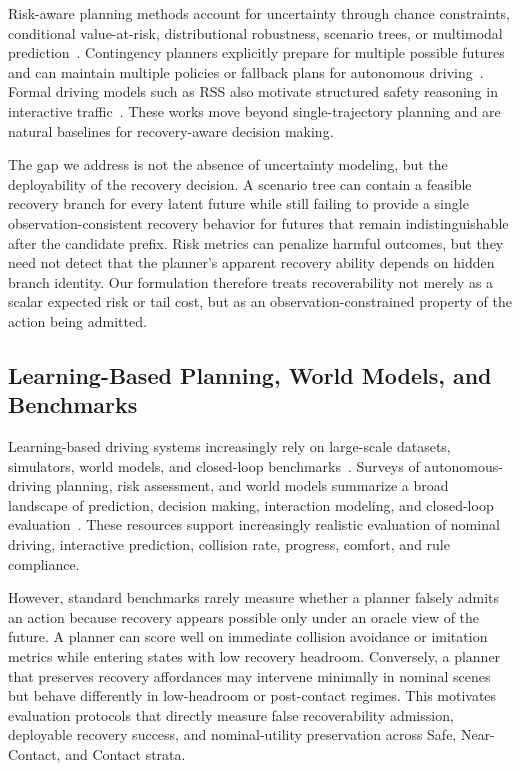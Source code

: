 \documentclass[conference]{IEEEtran}
\begin{document}
Risk-aware planning methods account for uncertainty through chance constraints, conditional value-at-risk, distributional robustness, scenario trees, or multimodal prediction~\cite{uryasev2000conditional,hakobyan2021wasserstein,safaoui2024distributionally,batkovic2020robust,nair2024predictive}.  Contingency planners explicitly prepare for multiple possible futures and can maintain multiple policies or fallback plans for autonomous driving~\cite{li2023marc,mustafa2024racp}.  Formal driving models such as RSS also motivate structured safety reasoning in interactive traffic~\cite{shalev2017formal}.  These works move beyond single-trajectory planning and are natural baselines for recovery-aware decision making.

The gap we address is not the absence of uncertainty modeling, but the deployability of the recovery decision.  A scenario tree can contain a feasible recovery branch for every latent future while still failing to provide a single observation-consistent recovery behavior for futures that remain indistinguishable after the candidate prefix.  Risk metrics can penalize harmful outcomes, but they need not detect that the planner's apparent recovery ability depends on hidden branch identity.  Our formulation therefore treats recoverability not merely as a scalar expected risk or tail cost, but as an observation-constrained property of the action being admitted.

\subsection{Learning-Based Planning, World Models, and Benchmarks}

Learning-based driving systems increasingly rely on large-scale datasets, simulators, world models, and closed-loop benchmarks~\cite{dosovitskiy2017carla,caesar2021nuplan,li2022metadrive,ettinger2021large,wilson2023argoverse,zhan2019interaction,althoff2017commonroad,krajewski2018highd,caesar2020nuscenes}.  Surveys of autonomous-driving planning, risk assessment, and world models summarize a broad landscape of prediction, decision making, interaction modeling, and closed-loop evaluation~\cite{ding2025understanding,lu2025risk,hu2025survey}.  These resources support increasingly realistic evaluation of nominal driving, interactive prediction, collision rate, progress, comfort, and rule compliance.

However, standard benchmarks rarely measure whether a planner falsely admits an action because recovery appears possible only under an oracle view of the future.  A planner can score well on immediate collision avoidance or imitation metrics while entering states with low recovery headroom.  Conversely, a planner that preserves recovery affordances may intervene minimally in nominal scenes but behave differently in low-headroom or post-contact regimes.  This motivates evaluation protocols that directly measure false recoverability admission, deployable recovery success, and nominal-utility preservation across Safe, Near-Contact, and Contact strata.
\end{document}
